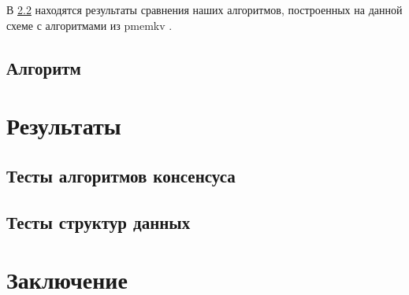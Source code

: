 \documentclass[pdftex,ptm,12pt,a4paper]{report}
\theoremstyle{definition}
\begin{document}
В \ref{pmemkvtests} находятся результаты сравнения наших алгоритмов, построенных на данной схеме с алгоритмами из pmemkv \cite{pmemkv}.

\section{Алгоритм}

\chapter{Результаты}
\section{Тесты алгоритмов консенсуса}
\section{Тесты структур данных}
\label{pmemkvtests}

\chapter{Заключение}



\end{document}
